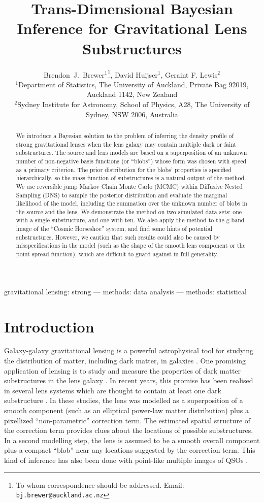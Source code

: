 \documentclass[useAMS,usenatbib]{mn2e}
\title[]
{Trans-Dimensional Bayesian Inference for Gravitational Lens Substructures}
\author[Brewer, Huijser and Lewis]{%
  Brendon~J.~Brewer$^{1}$\thanks{To whom correspondence should be addressed. Email: {\tt bj.brewer@auckland.ac.nz}},
  David Huijser$^{1}$,
  Geraint F. Lewis$^2$
  \medskip\\
  $^1$Department of Statistics, The University of Auckland, Private Bag 92019, Auckland 1142, New Zealand\\
  $^2$Sydney Institute for Astronomy, School of Physics, A28,
  The University of Sydney, NSW 2006, Australia}
\newcommand{\revisions}{\color{blue}}
\begin{document}
             
\date{}
             
\maketitle

\label{firstpage}

\begin{abstract}
We introduce a Bayesian solution to the problem of inferring the density
profile of strong gravitational lenses when the lens galaxy may contain
multiple dark or faint substructures. The source and lens models are based on
a superposition of an unknown number of non-negative basis functions
(or ``blobs'') whose form was chosen with speed as a primary criterion.
The prior distribution for the blobs' properties is specified hierarchically,
so the mass function of substructures is a natural output of the method.
We use reversible
jump Markov Chain Monte Carlo (MCMC) within Diffusive Nested Sampling (DNS) to
sample the posterior distribution and evaluate the marginal likelihood of the
model, including the summation over the unknown
number of blobs in the source and the lens.
We demonstrate the method on {\revisions two
simulated data sets: one with a single
substructure, and one with ten}. We also
apply the method to the g-band
image of the ``Cosmic Horseshoe'' system, and find some
hints of potential substructures. However, we caution that such results could
also be caused by misspecifications in the model (such as the shape of
the smooth lens component or the point spread function),
which are difficult to guard against in full generality.
\end{abstract}


\begin{keywords}
gravitational lensing: strong --- methods: data analysis --- methods: statistical
\end{keywords}

\section{Introduction}
Galaxy-galaxy gravitational lensing is a powerful astrophysical tool for studying
the distribution of matter, including dark matter, in galaxies
\citep{treu}. One promising application of lensing is to study
and measure the properties of dark matter substructures in the lens
galaxy \citep{koopmans}.
In recent years, this promise has been realised in several lens systems
which are thought to contain at least one dark substructure
\citep{vegetti1, vegetti2, vegetti3}. In these studies, the lens was modelled
as a superposition of a smooth component (such as an elliptical power-law
matter distribution) plus a pixellized ``non-parametric'' correction term.
The estimated spatial structure of the correction term provides clues about
the locations of possible substructures. In a second modelling step, the lens
is assumed to be a smooth overall component plus a compact ``blob'' near any
locations suggested by the correction term. This kind of inference has also
been done with point-like multiple images of QSOs \citep{2012MNRAS.419..936F}.
\end{document}
